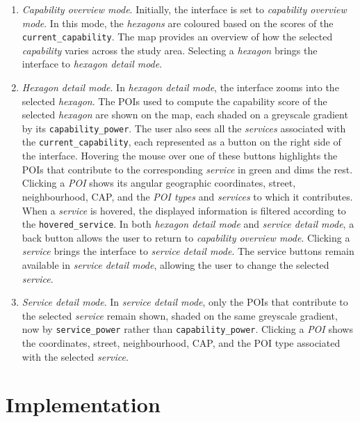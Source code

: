 \documentclass{article}
\begin{document}
\begin{enumerate}
    \item \emph{Capability overview mode}. Initially, the interface is set to \emph{capability overview mode}. In this mode, the \emph{hexagons} are coloured based on the scores of the \texttt{current\_capability}. The map provides an overview of how the selected \emph{capability} varies across the study area. Selecting a \emph{hexagon} brings the interface to \emph{hexagon detail mode}.
    \item \emph{Hexagon detail mode}. In \emph{hexagon detail mode}, the interface zooms into the selected \emph{hexagon}. The POIs used to compute the capability score of the selected \emph{hexagon} are shown on the map, each shaded on a greyscale gradient by its \texttt{capability\_power}. The user also sees all the \emph{services} associated with the \texttt{current\_capability}, each represented as a button on the right side of the interface. Hovering the mouse over one of these buttons highlights the POIs that contribute to the corresponding \emph{service} in green and dims the rest. Clicking a \emph{POI} shows its angular geographic coordinates, street, neighbourhood, CAP, and the \emph{POI types} and \emph{services} to which it contributes. When a \emph{service} is hovered, the displayed information is filtered according to the \texttt{hovered\_service}. In both \emph{hexagon detail mode} and \emph{service detail mode}, a back button allows the user to return to \emph{capability overview mode}. Clicking a \emph{service} brings the interface to \emph{service detail mode}. The service buttons remain available in \emph{service detail mode}, allowing the user to change the selected \emph{service}.
    \item \emph{Service detail mode}. In \emph{service detail mode}, only the POIs that contribute to the selected \emph{service} remain shown, shaded on the same greyscale gradient, now by \texttt{service\_power} rather than \texttt{capability\_power}. Clicking a \emph{POI} shows the coordinates, street, neighbourhood, CAP, and the POI type associated with the selected \emph{service}.
\end{enumerate}

\section{Implementation}
\end{document}

